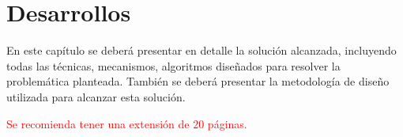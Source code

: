 \chapter{Desarrollos}\label{tecnicas}

En este capítulo se deberá presentar en detalle la solución alcanzada, incluyendo todas las técnicas, mecanismos, algoritmos diseñados para resolver la problemática planteada. También se deberá presentar la metodología de diseño utilizada para alcanzar esta solución.

\textcolor{red}{Se recomienda tener una extensión de $20$ páginas.}

